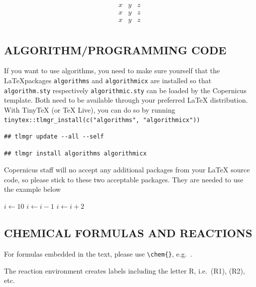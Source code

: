 \documentclass[gc, manuscript, english]{copernicus}
\begin{document}
\[
\begin{matrix}
x & y & z\\
x & y & z\\
x & y & z\\
\end{matrix}
\]

\subsection{ALGORITHM/PROGRAMMING CODE}

If you want to use algorithms, you need to make sure yourself that the
\LaTeX packages \texttt{algorithms} and \texttt{algorithmicx} are
installed so that \texttt{algorithm.sty} respectively
\texttt{algorithmic.sty} can be loaded by the Copernicus template. Both
need to be available through your preferred \LaTeX{} distribution. With
TinyTeX (or TeX Live), you can do so by running
\texttt{tinytex::tlmgr\_install(c("algorithms",\ "algorithmicx"))}

\begin{verbatim}
## tlmgr update --all --self
\end{verbatim}

\begin{verbatim}
## tlmgr install algorithms algorithmicx
\end{verbatim}

Copernicus staff will no accept any additional packages from your LaTeX
source code, so please stick to these two acceptable packages. They are
needed to use the example below

\begin{algorithm}
\caption{Algorithm Caption}
\label{a1}
\begin{algorithmic}
\STATE $i\gets 10$
        \STATE $i\gets i-1$
\ELSE
                \STATE $i\gets i+2$
        \ENDIF
\ENDIF
\end{algorithmic}
\end{algorithm}

\subsection{CHEMICAL FORMULAS AND REACTIONS}

For formulas embedded in the text, please use
\texttt{\textbackslash{}chem\{\}}, e.g.~.

The reaction environment creates labels including the letter R,
i.e.~(R1), (R2), etc.
\end{document}
